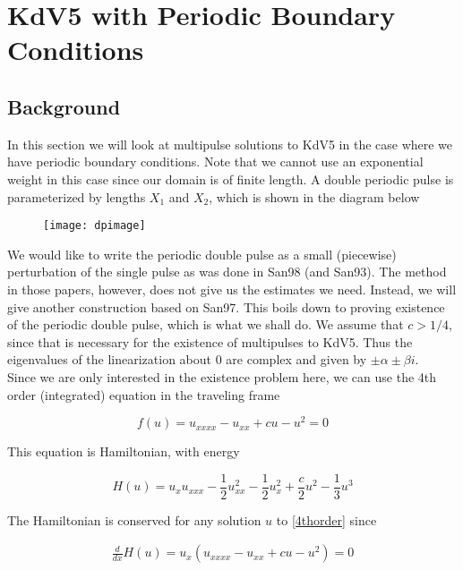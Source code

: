 \documentclass[12pt]{article}
\begin{document}
\section{KdV5 with Periodic Boundary Conditions}

\subsection{Background}

In this section we will look at multipulse solutions to KdV5 in the case where we have periodic boundary conditions. Note that we cannot use an exponential weight in this case since our domain is of finite length. A double periodic pulse is parameterized by lengths $X_1$ and $X_2$, which is shown in the diagram below 

\begin{figure}[H]
\texttt{[image: dpimage]}
\end{figure}

We would like to write the periodic double pulse as a small (piecewise) perturbation of the single pulse as was done in San98 (and San93). The method in those papers, however, does not give us the estimates we need. Instead, we will give another construction based on San97. This boils down to proving existence of the periodic double pulse, which is what we shall do. We assume that $c > 1/4$, since that is necessary for the existence of multipulses to KdV5. Thus the eigenvalues of the linearization about $0$ are complex and given by $\pm \alpha \pm \beta i$.\\

Since we are only interested in the existence problem here, we can use the 4th order (integrated) equation in the traveling frame

\begin{equation}\label{4thorder}
f(u) = u_{xxxx} - u_{xx} + c u - u^2 = 0
\end{equation}

This equation is Hamiltonian, with energy 

\begin{equation}\label{4thorderE}
H(u) = u_x u_{xxx} - \frac{1}{2}u_{xx}^2 - \frac{1}{2}u_x^2 + \frac{c}{2}u^2 - \frac{1}{3}u^3
\end{equation}

The Hamiltonian is conserved for any solution $u$ to \eqref{4thorder} since

\begin{align*}
\frac{d}{dx}H(u) = u_x(u_{xxxx} - u_{xx} + c u - u^2) = 0
\end{align*}
\end{document}

